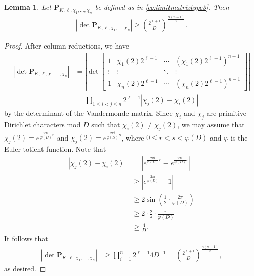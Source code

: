 \documentclass[11pt,letterpaper,reqno]{amsart}
\numberwithin{figure}{section}
\numberwithin{table}{section}
\theoremstyle{definition}
\theoremstyle{plain}
\newtheorem{lemma}[theorem]{Lemma}
\theoremstyle{definition}
\theoremstyle{definition}
\theoremstyle{remark}
\numberwithin{equation}{section}
\theoremstyle{remark}
\begin{document}
\begin{lemma}\label{lem:lowerboundoflimitmatrix3}
   Let $\mathbf{P}_{K,\ell,\chi_1,...,\chi_n}$ be defined as in \eqref{eq:limitmatrixtype3}. Then 
   \begin{align*}
\left|\det \mathbf{P}_{K,\ell,\chi_1,...,\chi_n}\right|\geq\left(\frac{2^{\ell+1}}{D}\right)^{\frac{n(n-1)}{2}}.
   \end{align*}
\end{lemma}
\begin{proof}
        After column reductions, we have 
\begin{align*}
\left|\det \mathbf{P}_{K,\ell,\chi_1,...,\chi_n}\right|&=\left|\det\begin{bmatrix}
        1 & \chi_1(2)2^{\ell-1}  & \cdots & (\chi_1(2)2^{\ell-1})^{n-1}\\
        \vdots  & \vdots & \ddots & \vdots\\ 
       1 & \chi_n(2)2^{\ell-1} &  \cdots & (\chi_n(2)2^{\ell-1})^{n-1}
    \end{bmatrix}\right|\\&=\prod_{1\leq i<j\leq n}2^{\ell-1}\left|\chi_j(2)-\chi_i(2)\right|
\end{align*}
by the determinant of the Vandermonde matrix. Since $\chi_i$ and $\chi_j$ are primitive Dirichlet characters mod $D$ such that $\chi_i(2)\neq\chi_j(2)$, we may assume that $\chi_j(2)=e^{\frac{2\pi i}{\varphi(D)}r}$ and $\chi_j(2)=e^{\frac{2\pi i}{\varphi(D)}s}$, where $0\leq r<s<\varphi(D)$ and $\varphi$ is the Euler-totient function. Note that 
\begin{align*}
    |\chi_j(2)-\chi_i(2)|&=\left|e^{\frac{2\pi i}{\varphi(D)}r}-e^{\frac{2\pi i}{\varphi(D)}s}\right|\\&\geq\left|e^{\frac{2\pi i}{\varphi(D)}}-1\right|\\&
    \geq2\sin\left(\frac{1}{2}\cdot\frac{2\pi}{\varphi(D)}\right)\\&\geq2\cdot\frac{2}{\pi}\cdot\frac{\pi}{\varphi(D)}\\&\geq\frac{4}{D}.
\end{align*}
It follows that 
\begin{align*}
    \left|\det \mathbf{P}_{K,\ell,\chi_1,...,\chi_n}\right|&\geq\prod_{i=1}^n 2^{\ell-1}4D^{-1}=\left(\frac{2^{\ell+1}}{D}\right)^{\frac{n(n-1)}{2}},
\end{align*}
as desired.
\end{proof}
\end{document}
